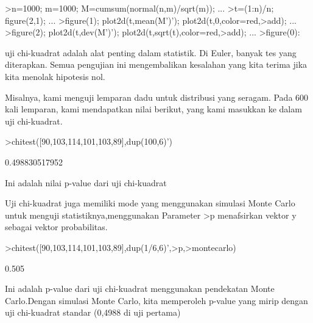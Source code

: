 \documentclass[a4paper,10pt]{article}
\begin{document}
\begin{eulernotebook}
\begin{eulercomment}
\begin{eulercomment}
\begin{eulerprompt}
>n=1000; m=1000; M=cumsum(normal(n,m)/sqrt(m)); ...
>t=(1:n)/n; figure(2,1); ...
>figure(1); plot2d(t,mean(M')'); plot2d(t,0,color=red,>add); ...
>figure(2); plot2d(t,dev(M')'); plot2d(t,sqrt(t),color=red,>add); ...
>figure(0):
\end{eulerprompt}
\begin{eulercomment}
uji chi-kuadrat adalah alat penting dalam statistik. Di Euler, banyak
tes yang diterapkan. Semua pengujian ini mengembalikan kesalahan yang
kita terima jika kita menolak hipotesis nol.

Misalnya, kami menguji lemparan dadu untuk distribusi yang seragam.
Pada 600 kali lemparan, kami mendapatkan nilai berikut, yang kami
masukkan ke dalam uji chi-kuadrat.
\end{eulercomment}
\begin{eulerprompt}
>chitest([90,103,114,101,103,89],dup(100,6)')
\end{eulerprompt}
\begin{euleroutput}
  0.498830517952
\end{euleroutput}
\begin{eulercomment}
Ini adalah nilai p-value dari uji chi-kuadrat

Uji chi-kuadrat juga memiliki mode yang menggunakan simulasi Monte
Carlo untuk menguji statistiknya,menggunakan Parameter \textgreater{}p menafsirkan
vektor y sebagai vektor probabilitas.
\end{eulercomment}
\begin{eulerprompt}
>chitest([90,103,114,101,103,89],dup(1/6,6)',>p,>montecarlo)
\end{eulerprompt}
\begin{euleroutput}
  0.505
\end{euleroutput}
\begin{eulercomment}
Ini adalah p-value dari uji chi-kuadrat menggunakan pendekatan Monte
Carlo.Dengan simulasi Monte Carlo, kita memperoleh p-value yang mirip
dengan uji chi-kuadrat standar (0,4988 di uji pertama)


\end{eulercomment}
\end{eulercomment}
\end{eulercomment}
\end{eulernotebook}
\end{document}
